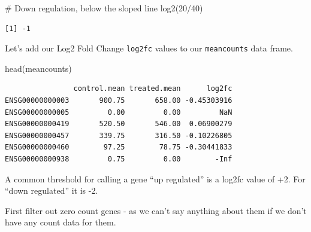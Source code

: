 \documentclass[
  letterpaper,
  DIV=11,
  numbers=noendperiod]{scrartcl}
\newenvironment{Shaded}{\begin{snugshade}}{\end{snugshade}}
\newcommand{\CommentTok}[1]{\textcolor[rgb]{0.37,0.37,0.37}{#1}}
\newcommand{\DecValTok}[1]{\textcolor[rgb]{0.68,0.00,0.00}{#1}}
\newcommand{\FunctionTok}[1]{\textcolor[rgb]{0.28,0.35,0.67}{#1}}
\newcommand{\NormalTok}[1]{\textcolor[rgb]{0.00,0.23,0.31}{#1}}
\newcommand{\OtherTok}[1]{\textcolor[rgb]{0.00,0.23,0.31}{#1}}
\newcommand{\SpecialCharTok}[1]{\textcolor[rgb]{0.37,0.37,0.37}{#1}}
\newcommand{\StringTok}[1]{\textcolor[rgb]{0.13,0.47,0.30}{#1}}
\begin{document}
\begin{Shaded}
\begin{Highlighting}[]
\CommentTok{\# Down regulation, below the sloped line}
\FunctionTok{log2}\NormalTok{(}\DecValTok{20}\SpecialCharTok{/}\DecValTok{40}\NormalTok{)}
\end{Highlighting}
\end{Shaded}

\begin{verbatim}
[1] -1
\end{verbatim}

Let's add our Log2 Fold Change \texttt{log2fc} values to our
\texttt{meancounts} data frame.

\begin{Shaded}
\end{Shaded}

\begin{Shaded}
\begin{Highlighting}[]
\FunctionTok{head}\NormalTok{(meancounts)}
\end{Highlighting}
\end{Shaded}

\begin{verbatim}
                control.mean treated.mean      log2fc
ENSG00000000003       900.75       658.00 -0.45303916
ENSG00000000005         0.00         0.00         NaN
ENSG00000000419       520.50       546.00  0.06900279
ENSG00000000457       339.75       316.50 -0.10226805
ENSG00000000460        97.25        78.75 -0.30441833
ENSG00000000938         0.75         0.00        -Inf
\end{verbatim}

A common threshold for calling a gene ``up regulated'' is a log2fc value
of +2. For ``down regulated'' it is -2.

First filter out zero count genes - as we can't say anything about them
if we don't have any count data for them.

\begin{Shaded}
\end{Shaded}
\end{document}
